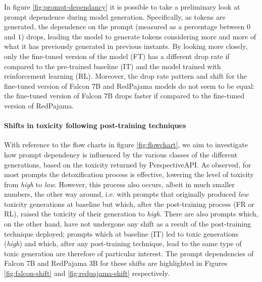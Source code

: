 In figure \ref{fig:prompt-dependancy} it is possible to take a preliminary look at prompt dependence during model generation. Specifically, as tokens are generated, the dependence on the prompt (measured as a percentage between $0$ and $1$) drops, leading the model to generate tokens considering more and more of what it has previously generated in previous instants. By looking more closely, only the fine-tuned version of the model (FT) has a different drop rate if compared to the pre-trained baseline (IT) and the model trained with reinforcement learning (RL). Moreover, the drop rate pattern and shift for the fine-tuned version of Falcon 7B and RedPajama models do not seem to be equal: the fine-tuned version of Falcon 7B drops faster if compared to the fine-tuned version of RedPajama.


\paragraph{Shifts in toxicity following post-training techniques} With reference to the flow charts in figure \ref{fig:flowchart}, we aim to investigate how prompt dependency is influenced by the various classes of the different generations, based on the toxicity returned by PerspectiveAPI. As observed, for most prompts the detoxification process is effective, lowering the level of toxicity from \textit{high} to \textit{low}. However, this process also occurs, albeit in much smaller numbers, the other way around, i.e. with prompts that originally produced \textit{low} toxicity generations at baseline but which, after the post-training process (FR or RL), raised the toxicity of their generation to \textit{high}. There are also prompts which, on the other hand, have not undergone any shift as a result of the post-training technique deployed; prompts which at baseline (IT) led to toxic generations (\textit{high}) and which, after any post-training technique, lead to the same type of toxic generation are therefore of particular interest. The prompt dependencies of Falcon 7B and RedPajama 3B for these shifts are highlighted in Figures \ref{fig:falcon-shift} and \ref{fig:redpajama-shift} respectively.

